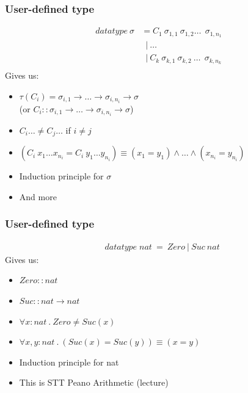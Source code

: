 \documentclass{beamer}
\newcommand*{\mdot}{\ensuremath{\ . \ }}
\begin{document}
  \begin{frame}
    \frametitle{User-defined type}
    \begin{equation*}
      \begin{split}
        datatype \ \sigma & = C_1 \ \sigma_{1,1} \ \sigma_{1, 2} \dots \ \ \sigma_{1, n_1} \\
        & \; \ | \ \dots \\
        & \; \ | \ C_k \ \sigma_{k,1} \ \sigma_{k, 2}  \ \dots \ \ \sigma_{k, n_k} \\
      \end{split}
    \end{equation*}
    Gives us:
    \begin{itemize}
      \item $\tau(C_i) = \sigma_{i, 1} \rightarrow \dots \rightarrow \sigma_{i, n_i} \rightarrow \sigma$ \\
      (or $C_i :: \sigma_{i, 1} \rightarrow \dots \rightarrow \sigma_{i, n_i} \rightarrow \sigma$)
      \item $C_i \dots \neq C_j \dots$ if $i \neq j$
      \item $(C_i \ x_1 \dots x_{n_i} = C_i \ y_1 \dots y_{n_i}) \equiv (x_1 = 
      y_1) \land \dots \land (x_{n_i} = y_{n_i})$
      \item Induction principle for $\sigma$
      \item And more
    \end{itemize}

  \end{frame}

  \begin{frame}
    \frametitle{User-defined type}
    \begin{equation*}
      \begin{split}
        & datatype \; nat \ = \ Zero \ | \ Suc \ nat
      \end{split}
    \end{equation*}
    Gives us:
    \begin{itemize}
      \item $Zero :: nat$
      \item $Suc :: nat \rightarrow nat$
      \item $\forall x : nat \mdot Zero \neq Suc (x)$
      \item $\forall x, y : nat \mdot (Suc(x) = Suc(y)) \equiv (x = y)$
      \item Induction principle for nat
      \item This is STT Peano Arithmetic (lecture)
    \end{itemize}

  \end{frame}
\end{document}
